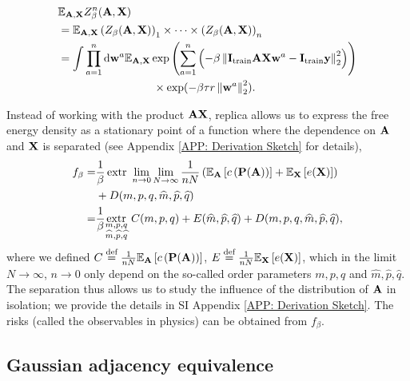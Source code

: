 \documentclass[9pt,twocolumn]{pnas-new}
\begin{document}
\begin{equation}\label{eqn: z short}
\begin{aligned}
  &\mathbb{E}_{\mA,\mX}Z^{n}_{\beta}(\mA,\mX)\\
  &=\mathbb{E}_{\mA,\mX}\left(Z_{\beta}(\mA,\mX)\right)_{1}\times\cdots\times \left(Z_{\beta}(\mA,\mX)\right)_{n}\\
  &=\int\prod_{a=1}^{n}\mathrm{d}\vw^{a}\mathbb{E}_{\mA,\mX} \exp\left(\sum_{a=1}^{n} \left(-\beta\norm{\mI_{\text{train}} \mA\mX\vw^a-\mI_{\text{train}} \vy}_2^2\right) \right)\\
  &\hspace{3cm}\times \exp(-\beta \tau r \norm{\vw^a}_2^2).
\end{aligned}
\end{equation}

Instead of working with the product $\mathbf{A}\mathbf{X}$, replica allows us to express the free energy density as a stationary point of a function where the dependence on $\mathbf{A}$ and $\mathbf{X}$ is separated (see Appendix \ref{APP: Derivation Sketch} for details),
\begin{equation}\label{eqn: sketch saddle point}
\begin{aligned}
    f_\beta=&\frac{1}{\beta}\operatorname{extr}~ \lim_{n\to0}\lim_{N\to \infty} \frac{1}{nN} \left(\mathbb{E}_{\mathbf{A}}\left[c\left(\mathbf{P}(\mathbf{A})\right)\right]+\mathbb{E}_{\mathbf{X}}\left[e(\mathbf{X})\right]\right)\\
    &+D(m,p,q,\widehat{m},\widehat{p},\widehat{q})\\
    =&\frac{1}{\beta}\underset{\substack{m,p,q \\ \widehat{m},\widehat{p},\widehat{q}}}{\operatorname{extr}}~ C(m,p,q)+E(\widehat{m},\widehat{p},\widehat{q})+D(m,p,q,\widehat{m},\widehat{p},\widehat{q}),
\end{aligned} 
\end{equation}
where we defined $C \overset{\text{def}}{=} \frac{1}{nN}\mathbb{E}_{\mathbf{A}}\left[c\left(\mathbf{P}(\mathbf{A})\right)\right]$, $E \overset{\text{def}}{=} \frac{1}{nN}\mathbb{E}_{\mathbf{X}}\left[e(\mathbf{X})\right]$, which in the limit $N\to\infty$, $n\to 0$ only depend on the so-called order parameters $m,p,q$ and $\widehat{m},\widehat{p},\widehat{q}$. The separation thus allows us to study the influence of the distribution of $\mathbf{A}$ in isolation; we provide the details in SI Appendix \ref{APP: Derivation Sketch}. The risks (called the observables in physics) can be obtained from $f_\beta$.  

\subsection*{Gaussian adjacency equivalence}
\end{document}
